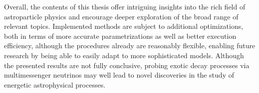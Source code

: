 \begin{spacing}{0.995}
	Overall, the contents of this thesis offer intriguing insights into the rich field of astroparticle physics and encourage deeper
	exploration of the broad range of relevant topics. Implemented methods are subject to additional optimizations, both in terms
	of more accurate parametrizations as well as better execution efficiency, although the procedures already are reasonably flexible,
	enabling future research by being able to easily adapt to more sophisticated models. Although the presented results are not fully
	conclusive, probing exotic decay processes via multimessenger neutrinos may well lead to novel discoveries in the study of
	energetic astrophysical processes.
\end{spacing}
